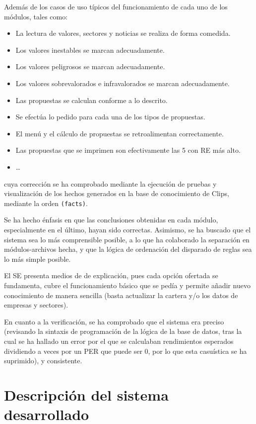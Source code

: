 \documentclass[a4paper,11pt]{article}
\begin{document}
Además de los casos de uso típicos del funcionamiento de cada uno de los módulos, tales como:
\begin{itemize}
 \item La lectura de valores, sectores y noticias se realiza de forma comedida.
 \item Los valores inestables se marcan adecuadamente.
 \item Los valores peligrosos se marcan adecuadamente.
 \item Los valores sobrevalorados e infravalorados se marcan adecuadamente.
 \item Las propuestas se calculan conforme a lo descrito.
 \item Se efectúa lo pedido para cada una de los tipos de propuestas.
 \item El menú y el cálculo de propuestas se retroalimentan correctamente.
 \item Las propuestas que se imprimen son efectivamente las 5 con RE más alto.
 \item \ldots
\end{itemize}

cuya corrección se ha comprobado mediante la ejecución de pruebas y visualización de los hechos generados en la base de
conocimiento de Clips, mediante la orden \texttt{(facts)}.

Se ha hecho énfasis en que las conclusiones obtenidas en cada módulo, especialmente en el último, hayan sido correctas. Asimismo,
se ha buscado que el sistema sea lo más comprensible posible, a lo que ha colaborado la separación en módulos-archivos hecha, y
que la lógica de ordenación del disparado de reglas sea lo más simple posible.

El SE presenta medios de de explicación, pues cada opción ofertada se fundamenta, cubre el funcionamiento básico que se pedía
y permite añadir nuevo conocimiento de manera sencilla (basta actualizar la cartera y/o los datos de empresas y sectores).

En cuanto a la verificación, se ha comprobado que el sistema era preciso (revisando la sintaxis de programación de la lógica
de la base de datos, tras la cual se ha hallado un error por el que se calculaban rendimientos esperados dividiendo a veces
por un PER que puede ser 0, por lo que esta casuística se ha suprimido), y consistente.

\section{Descripción del sistema desarrollado}
\end{document}
